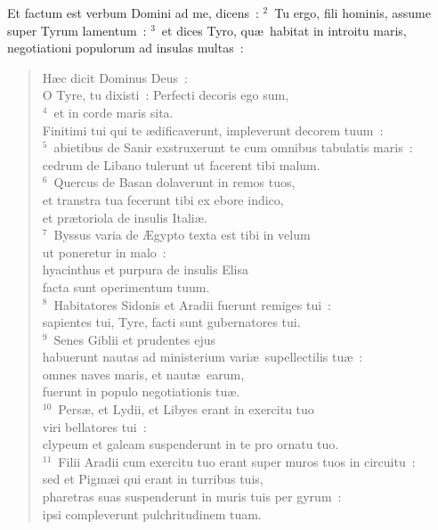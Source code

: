 \bchapter
\lettrine[lines=3,image=true,loversize=0.05,lraise=-0.03]{E}{}t factum est verbum Domini ad me, dicens~:
${}^{2}$~Tu ergo, fili hominis, assume super Tyrum lamentum~:
${}^{3}$~et dices Tyro, qu\ae\ habitat in introitu maris, negotiationi populorum ad insulas multas~: \begin{flushleft}\begin{verse}H\ae c dicit Dominus Deus~:\\ O Tyre, tu dixisti~: Perfecti decoris ego sum,\\
${}^{4}$~et in corde maris sita.\\ Finitimi tui qui te \ae dificaverunt, impleverunt decorem tuum~:\\
${}^{5}$~abietibus de Sanir exstruxerunt te cum omnibus tabulatis maris~:\\ cedrum de Libano tulerunt ut facerent tibi malum.\\
${}^{6}$~Quercus de Basan dolaverunt in remos tuos,\\ et transtra tua fecerunt tibi ex ebore indico,\\ et pr\ae toriola de insulis Itali\ae .\\
${}^{7}$~Byssus varia de \AE gypto texta est tibi in velum\\ ut poneretur in malo~:\\ hyacinthus et purpura de insulis Elisa\\ facta sunt operimentum tuum.\\
${}^{8}$~Habitatores Sidonis et Aradii fuerunt remiges tui~:\\ sapientes tui, Tyre, facti sunt gubernatores tui.\\
${}^{9}$~Senes Giblii et prudentes ejus\\ habuerunt nautas ad ministerium vari\ae\ supellectilis tu\ae~:\\ omnes naves maris, et naut\ae\ earum,\\ fuerunt in populo negotiationis tu\ae .\\
${}^{10}$~Pers\ae , et Lydii, et Libyes erant in exercitu tuo\\ viri bellatores tui~:\\ clypeum et galeam suspenderunt in te pro ornatu tuo.\\
${}^{11}$~Filii Aradii cum exercitu tuo erant super muros tuos in circuitu~:\\ sed et Pigm\ae i qui erant in turribus tuis,\\ pharetras suas suspenderunt in muris tuis per gyrum~:\\ ipsi compleverunt pulchritudinem tuam.\\

\end{verse}
\end{flushleft}
